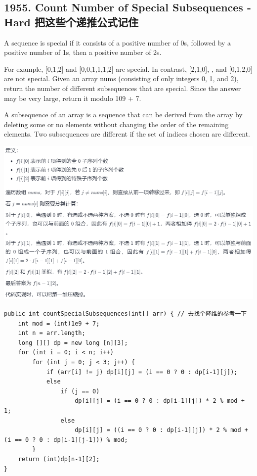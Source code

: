 \documentclass[9pt, b5paaper]{book}
\begin{document}
\subsection{1955. Count Number of Special Subsequences - Hard 把这些个递推公式记住}
\label{sec-1-4-58}
A sequence is special if it consists of a positive number of 0s, followed by a positive number of 1s, then a positive number of 2s.

For example, [0,1,2] and [0,0,1,1,1,2] are special.
In contrast, [2,1,0], \footnotemark[2]{}, and [0,1,2,0] are not special.
Given an array nums (consisting of only integers 0, 1, and 2), return the number of different subsequences that are special. Since the answer may be very large, return it modulo 109 + 7.

A subsequence of an array is a sequence that can be derived from the array by deleting some or no elements without changing the order of the remaining elements. Two subsequences are different if the set of indices chosen are different.

\includegraphics[width=.9\linewidth]{./pic/specialSeq.png}

\begin{verbatim}
public int countSpecialSubsequences(int[] arr) { // 去找个降维的参考一下
    int mod = (int)1e9 + 7;
    int n = arr.length;
    long [][] dp = new long [n][3];
    for (int i = 0; i < n; i++) 
        for (int j = 0; j < 3; j++) {
            if (arr[i] != j) dp[i][j] = (i == 0 ? 0 : dp[i-1][j]);
            else 
                if (j == 0)
                    dp[i][j] = (i == 0 ? 0 : dp[i-1][j]) * 2 % mod + 1;
                else
                    dp[i][j] = ((i == 0 ? 0 : dp[i-1][j]) * 2 % mod + (i == 0 ? 0 : dp[i-1][j-1])) % mod;
        }
    return (int)dp[n-1][2];
}
\end{verbatim}
\end{document}
